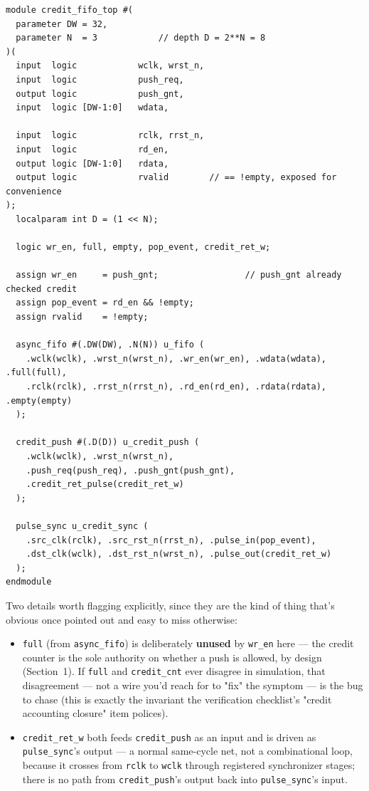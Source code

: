 \documentclass[12pt]{article}
\begin{document}
\begin{lstlisting}[style=sv,caption={Top-level: async FIFO + credit-based push/pop, both domains}]
module credit_fifo_top #(
  parameter DW = 32,
  parameter N  = 3            // depth D = 2**N = 8
)(
  input  logic            wclk, wrst_n,
  input  logic            push_req,
  output logic            push_gnt,
  input  logic [DW-1:0]   wdata,

  input  logic            rclk, rrst_n,
  input  logic            rd_en,
  output logic [DW-1:0]   rdata,
  output logic            rvalid        // == !empty, exposed for convenience
);
  localparam int D = (1 << N);

  logic wr_en, full, empty, pop_event, credit_ret_w;

  assign wr_en     = push_gnt;                 // push_gnt already checked credit
  assign pop_event = rd_en && !empty;
  assign rvalid    = !empty;

  async_fifo #(.DW(DW), .N(N)) u_fifo (
    .wclk(wclk), .wrst_n(wrst_n), .wr_en(wr_en), .wdata(wdata), .full(full),
    .rclk(rclk), .rrst_n(rrst_n), .rd_en(rd_en), .rdata(rdata), .empty(empty)
  );

  credit_push #(.D(D)) u_credit_push (
    .wclk(wclk), .wrst_n(wrst_n),
    .push_req(push_req), .push_gnt(push_gnt),
    .credit_ret_pulse(credit_ret_w)
  );

  pulse_sync u_credit_sync (
    .src_clk(rclk), .src_rst_n(rrst_n), .pulse_in(pop_event),
    .dst_clk(wclk), .dst_rst_n(wrst_n), .pulse_out(credit_ret_w)
  );
endmodule
\end{lstlisting}

Two details worth flagging explicitly, since they are the kind of thing
that's obvious once pointed out and easy to miss otherwise:

\begin{itemize}[leftmargin=1.4em]
  \item \texttt{full} (from \texttt{async\_fifo}) is deliberately
  \textbf{unused} by \texttt{wr\_en} here — the credit counter is the sole
  authority on whether a push is allowed, by design (Section~1). If
  \texttt{full} and \texttt{credit\_cnt} ever disagree in simulation, that
  disagreement — not a wire you'd reach for to "fix" the symptom — is the
  bug to chase (this is exactly the invariant the verification checklist's
  "credit accounting closure" item polices).
  \item \texttt{credit\_ret\_w} both feeds \texttt{credit\_push} as an
  input and is driven as \texttt{pulse\_sync}'s output — a normal
  same-cycle net, not a combinational loop, because it crosses from
  \texttt{rclk} to \texttt{wclk} through registered synchronizer stages;
  there is no path from \texttt{credit\_push}'s output back into
  \texttt{pulse\_sync}'s input.
\end{itemize}
\end{document}
